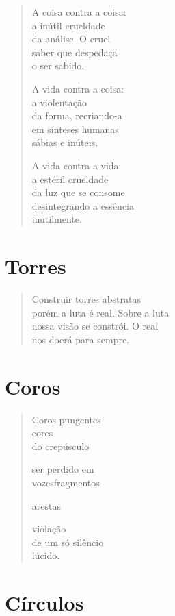 \begin{verse}
A coisa contra a coisa:\\
a inútil crueldade\\
da análise. O cruel\\
saber que despedaça\\
o ser sabido.

A vida contra a coisa:\\
a violentação\\
da forma, recriando-a\\
em sínteses humanas\\
sábias e inúteis.

A vida contra a vida:\\
a estéril crueldade\\
da luz que se consome\\
desintegrando a essência\\
inutilmente.
\end{verse}

\chapter{Torres}

\begin{verse}
Construir torres abstratas\\
porém a luta é real. Sobre a luta\\
nossa visão se constrói. O real\\
nos doerá para sempre.
\end{verse}

\chapter{Coros}

\begin{verse}
Coros pungentes\\
cores\\
do crepúsculo

ser perdido em\\
vozesfragmentos

arestas

violação\\
de um só silêncio\\
lúcido.
\end{verse}

\chapter{Círculos}

